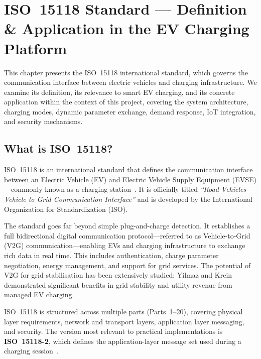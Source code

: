 \documentclass[12pt,a4paper]{report}
\begin{document}

\chapter{ISO~15118 Standard --- Definition \& Application in the EV Charging Platform}

This chapter presents the ISO~15118 international standard, which governs the communication
interface between electric vehicles and charging infrastructure. We examine its definition,
its relevance to smart EV charging, and its concrete application within the context of this
project, covering the system architecture, charging modes, dynamic parameter exchange, demand
response, IoT integration, and security mechanisms.

\section{What is ISO~15118?}

ISO~15118 is an international standard that defines the communication interface between an
Electric Vehicle (EV) and Electric Vehicle Supply Equipment (EVSE)---commonly known as a
charging station~\autocite{iso15118_2022}. It is officially titled \textit{``Road Vehicles---Vehicle
to Grid Communication Interface''} and is developed by the International Organization for
Standardization (ISO).

The standard goes far beyond simple plug-and-charge detection. It establishes a full bidirectional
digital communication protocol---referred to as Vehicle-to-Grid (V2G) communication---enabling EVs
and charging infrastructure to exchange rich data in real time. This includes authentication,
charge parameter negotiation, energy management, and support for grid services. The potential of
V2G for grid stabilisation has been extensively studied: Yilmaz and Krein~\autocite{yilmaz2013}
demonstrated significant benefits in grid stability and utility revenue from managed EV charging.

ISO~15118 is structured across multiple parts (Parts~1--20), covering physical layer requirements,
network and transport layers, application layer messaging, and security. The version most relevant
to practical implementations is \textbf{ISO~15118-2}, which defines the application-layer message
set used during a charging session~\autocite{iso15118_2022}.
\end{document}
